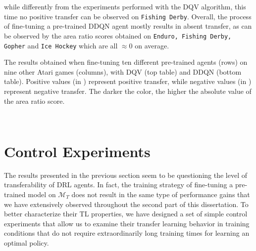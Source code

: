 while differently from the experiments performed with the DQV algorithm, this time no positive transfer can be observed on \texttt{Fishing Derby}. Overall, the process of fine-tuning a pre-trained DDQN agent mostly results in absent transfer, as can be observed by the area ratio scores obtained on \texttt{Enduro, Fishing Derby, Gopher} and \texttt{Ice Hockey} which are all $\approx 0$ on average.  


\begin{table}[t!]
	\caption{The results obtained when fine-tuning ten different pre-trained agents (rows) on nine other Atari games (columns), with DQV (top table) and DDQN (bottom table). Positive values (in ) represent positive transfer, while negative values (in ) represent negative transfer. The darker the color, the higher the absolute value of the area ratio score.} %
	{}
	\label{tab:dqv_res}


        ~\\
	{}
	\label{tab:ddqn_res}
\end{table}




\section{Control Experiments}
\label{sec:control_experiments}
The results presented in the previous section seem to be questioning the level of transferability of DRL agents. In fact, the training strategy of fine-tuning a pre-trained model on $\mathcal{M}_T$ does not result in the same type of performance gains that we have extensively observed throughout the second part of this dissertation. To better characterize their TL properties, we have designed a set of simple control experiments that allow us to examine their transfer learning behavior in training conditions that do not require extraordinarily long training times for learning an optimal policy.   

